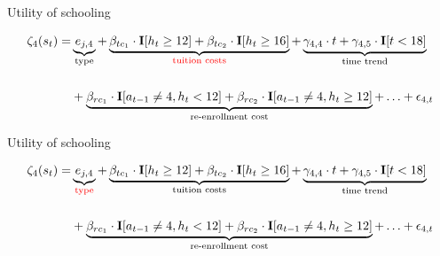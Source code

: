\begin{frame}{Utility of schooling}\vspace{0.25cm}

\begin{align*}
		\zeta_4(s_t)   = & \underbrace{e_{j,4}}_{\text{type}} + \underbrace{\beta_{tc_1} \cdot {\textbf{I}}[h_t \geq 12] + \beta_{tc_2} \cdot {\textbf{I}}[h_t \geq 16]}_{\color{red}\text{tuition costs}}  + \underbrace{\gamma_{4,4} \cdot t + \gamma_{4,5} \cdot {\textbf{I}}[t < 18]}_{\text{time trend}}  \\[15pt]
	    							  & + \underbrace{\beta_{rc_1} \cdot {\textbf{I}}[a_{t-1} \neq 4, h_t < 12]   + \beta_{rc_2} \cdot {\textbf{I}}[a_{t-1} \neq 4, h_t \geq 12]}_{\text{re-enrollment cost}}  + \hdots + \epsilon_{4,t}
\end{align*}


\end{frame}\addtocounter{framenumber}{-1}
\begin{frame}{Utility of schooling}\vspace{0.25cm}

\begin{align*}
		\zeta_4(s_t)   = & \underbrace{e_{j,4}}_{\color{red}\text{type}} + \underbrace{\beta_{tc_1} \cdot {\textbf{I}}[h_t \geq 12] + \beta_{tc_2} \cdot {\textbf{I}}[h_t \geq 16]}_{\text{tuition costs}}  + \underbrace{\gamma_{4,4} \cdot t + \gamma_{4,5} \cdot {\textbf{I}}[t < 18]}_{\text{time trend}}  \\[15pt]
	    							  & + \underbrace{\beta_{rc_1} \cdot {\textbf{I}}[a_{t-1} \neq 4, h_t < 12]   + \beta_{rc_2} \cdot {\textbf{I}}[a_{t-1} \neq 4, h_t \geq 12]}_{\text{re-enrollment cost}}  + \hdots + \epsilon_{4,t}
\end{align*}


\end{frame}
